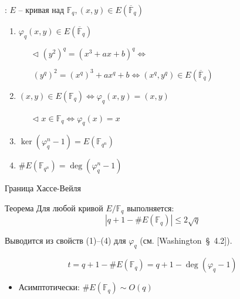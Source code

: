 \documentclass{beamer}
\begin{document}
\begin{frame}{}%
:
$E$ -- кривая над ${\mathbb{F}_q}, (x, y) \in E(\overline{\mathbb{F}}_q)$

\begin{enumerate}
    \item ${\varphi _q}(x,y) \in E( \overline{\mathbb{F}}_q )$
    \begin{itemize}
        \item[$\triangleleft$]
        $(y^2)^q = (x^3 + ax + b)^q \Leftrightarrow$
        \item[] $(y^q)^2 = (x^q)^3 + a x^q + b \Leftrightarrow (x^q, y^q) \in E ( \overline{\mathbb{F}}_q )$
        \structure{$\triangleright$}
    \end{itemize}
    
    \item $(x,y) \in E(\mathbb{F}_q) \Leftrightarrow \varphi_q(x,y) = (x,y)$
        \begin{itemize}
            \item[$\triangleleft$] $x \in \mathbb{F}_q \Leftrightarrow \varphi_q(x) = x$ \structure{$\triangleright$}
        \end{itemize}    
    \item $\mathop{\ker}(\varphi^n_q - 1) = E(\mathbb{F}_{q^n})$ \\
    \item $\# E( \mathbb{F}_{q^n} ) = \deg ( \varphi_q^n - 1 )$
\end{enumerate}
\end{frame}

\begin{frame}{Граница Хассе-Вейля} 
\begin{block}{Теорема} Для любой кривой $E/\mathbb{F}_q$ выполняется:
\[
| {q + 1 - \# E( {{\mathbb{F}_q}} )} | \leqslant 2\sqrt q 
\]
\end{block}
\structure{$\triangleleft$}
Выводится из свойств (1)--(4) для ${\varphi _q}$ (см. [Washington~\S~4.2]). 
\structure{$\triangleright$}

\[t  = q + 1 - \# E( {{\mathbb{F}_q}} ) = q + 1 - \deg ( {\varphi_q - 1} )\]

\begin{itemize}
    \item Асимптотически: $\# E(\mathbb{F}_q) \sim O(q)$
\end{itemize}
\end{frame}
\end{document}
